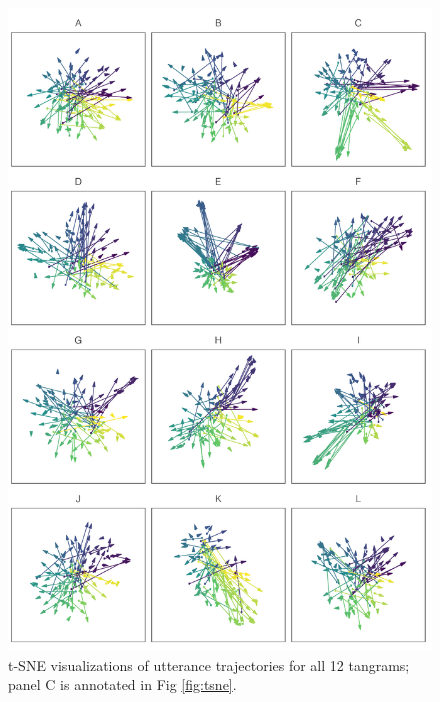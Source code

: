 \documentclass[alpha-refs]{wiley-article}
\begin{document}
\begin{figure}[h]
\centering
\includegraphics[scale=.53]{tsne-alltangrams.pdf}
\caption{t-SNE visualizations of utterance trajectories for all 12 tangrams; panel C is annotated in Fig \ref{fig:tsne}. }
\label{fig:all-tsne}
\end{figure}


\end{document}
